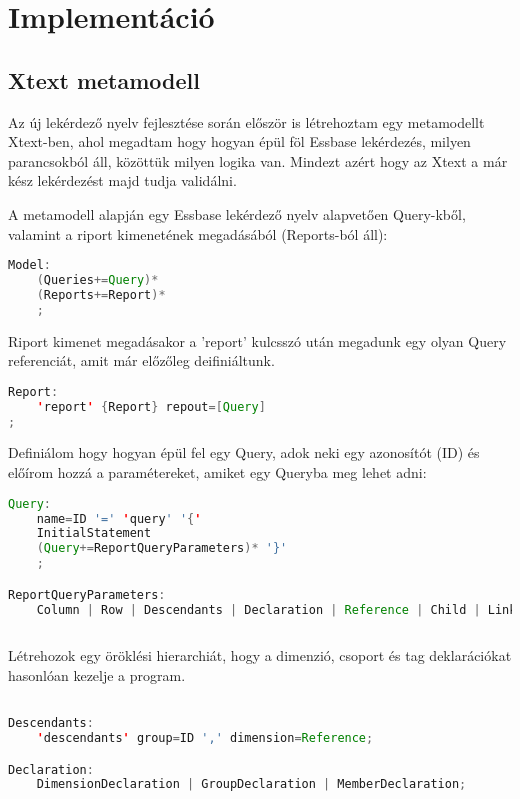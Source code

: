 \chapter{Implementáció}\label{sect:Ellaboration}
\section{Xtext metamodell}
Az új lekérdező nyelv fejlesztése során először is létrehoztam egy metamodellt Xtext-ben, ahol megadtam hogy hogyan épül föl Essbase lekérdezés, milyen parancsokból áll, közöttük milyen logika van. Mindezt azért hogy az Xtext a már kész lekérdezést majd tudja validálni.

A metamodell alapján egy Essbase lekérdező nyelv alapvetően Query-kből, valamint a riport kimenetének megadásából (Reports-ból áll):

\begin{lstlisting}[language=java,morekeywords={generate,dim,group,row,link,reportParameter,report,query},alsoletter={-},breaklines=true]
Model:
	(Queries+=Query)*
	(Reports+=Report)*
	;
\end{lstlisting}

Riport kimenet megadásakor a 'report' kulcsszó után megadunk egy olyan Query referenciát, amit már előzőleg deifiniáltunk.

\begin{lstlisting}[language=java,morekeywords={generate,dim,group,row,link,reportParameter,report,query},alsoletter={-},breaklines=true]
Report:
	'report' {Report} repout=[Query]
;
\end{lstlisting}

Definiálom hogy hogyan épül fel egy Query, adok neki egy azonosítót (ID) és előírom hozzá a paramétereket, amiket egy Queryba meg lehet adni:

\begin{lstlisting}[language=java,morekeywords={generate,dim,group,row,link,reportParameter,report,query},alsoletter={-},breaklines=true]
Query:
	name=ID '=' 'query' '{'
	InitialStatement
	(Query+=ReportQueryParameters)* '}'
	;

ReportQueryParameters:
	Column | Row | Descendants | Declaration | Reference | Child | Link | ReportParameter;
	
\end{lstlisting}

Létrehozok egy öröklési hierarchiát, hogy a dimenzió, csoport és tag deklarációkat hasonlóan kezelje a program.
\begin{lstlisting}[language=java,morekeywords={generate,dim,group,row,link,reportParameter,report,query},alsoletter={-},breaklines=true]

Descendants:
	'descendants' group=ID ',' dimension=Reference;

Declaration:
	DimensionDeclaration | GroupDeclaration | MemberDeclaration;
\end{lstlisting}


